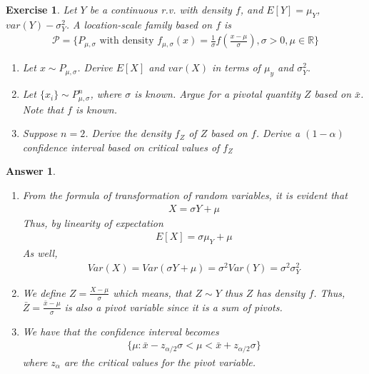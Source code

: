 \documentclass[12pt]{article}
\theoremstyle{colon}
\newtheorem{exercise}{Exercise}
\newtheorem*{answer}{Answer}
\begin{document}
\begin{exercise}
  Let $Y$ be a continuous r.v. with density $f$, and $E[Y] = \mu_Y$, $var(Y) - \sigma^2_Y$. A location-scale family based on $f$ is
  \begin{gather*}
    \mathcal{P} = \{ P_{\mu, \sigma} \text{ with density } f_{\mu, \sigma}(x) = \frac{1}{\sigma} f \left( \frac{x-\mu}{\sigma} \right), \sigma > 0, \mu \in \mathbb{R} \}
  \end{gather*}
  \begin{enumerate}[label=\arabic*)]
    \item Let $x \sim P_{\mu, \sigma}$. Derive $E[X]$ and $var(X)$ in terms of $\mu_y$ and $\sigma_Y^2$.
    \item Let $\{ x_i \} \sim P_{\mu, \sigma}^n$, where $\sigma$ is known. Argue for a pivotal quantity $Z$ based on $\bar{x}$. Note that $f$ is known.
    \item Suppose $n=2$. Derive the density $f_Z$ of $Z$ based on $f$. Derive a $(1-\alpha)$ confidence interval based on critical values of $f_Z$
  \end{enumerate}
\end{exercise}

\begin{answer}
  \leavevmode
  \begin{enumerate}[label=\arabic*)]
    \item From the formula of transformation of random variables, it is evident that
      \begin{gather*}
        X = \sigma Y + \mu
      \end{gather*}
      Thus, by linearity of expectation
      \begin{gather*}
        E[X] = \sigma \mu_Y + \mu
      \end{gather*}
      As well,
      \begin{gather*}
        Var(X) = Var(\sigma Y + \mu) = \sigma^2 Var(Y) = \sigma^2 \sigma_Y^2
      \end{gather*}
    \item We define $Z = \frac{X - \mu}{\sigma}$ which means, that $Z \sim Y$ thus $Z$ has density $f$. Thus, $\bar{Z} = \frac{\bar{x} - \mu}{\sigma}$ is also a pivot variable since it is a sum of pivots.
    \item We have that the confidence interval becomes
      \begin{gather*}
        \{ \mu : \bar{x} - z_{\alpha/2}\sigma < \mu < \bar{x} + z_{\alpha/2} \sigma \}
      \end{gather*}
      where $z_\alpha$ are the critical values for the pivot variable.
  \end{enumerate}
\end{answer}
\end{document}
